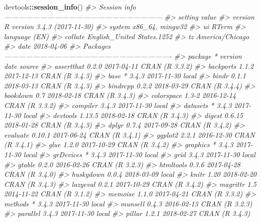 \documentclass [11pt, proquest] {uwthesis}[2015/03/03]
\newenvironment{Shaded}{}{}
\newcommand{\KeywordTok}[1]{\textcolor[rgb]{0.00,0.44,0.13}{\textbf{{#1}}}}
\newcommand{\CommentTok}[1]{\textcolor[rgb]{0.38,0.63,0.69}{\textit{{#1}}}}
\newcommand{\NormalTok}[1]{{#1}}
\newcommand{\OperatorTok}[1]{\textcolor[rgb]{0.00,0.44,0.13}{\textbf{{#1}}}}
\begin{document}
\begin{Shaded}
\begin{Highlighting}[]
\NormalTok{devtools}\OperatorTok{::}\KeywordTok{session_info}\NormalTok{()}
\CommentTok{#> Session info ------------------------------------------------------------------}
\CommentTok{#>  setting  value                       }
\CommentTok{#>  version  R version 3.4.3 (2017-11-30)}
\CommentTok{#>  system   x86_64, mingw32             }
\CommentTok{#>  ui       RTerm                       }
\CommentTok{#>  language (EN)                        }
\CommentTok{#>  collate  English_United States.1252  }
\CommentTok{#>  tz       America/Chicago             }
\CommentTok{#>  date     2018-04-06}
\CommentTok{#> Packages ----------------------------------------------------------------------}
\CommentTok{#>  package    * version date       source        }
\CommentTok{#>  assertthat   0.2.0   2017-04-11 CRAN (R 3.3.2)}
\CommentTok{#>  backports    1.1.2   2017-12-13 CRAN (R 3.4.3)}
\CommentTok{#>  base       * 3.4.3   2017-11-30 local         }
\CommentTok{#>  bindr        0.1.1   2018-03-13 CRAN (R 3.4.3)}
\CommentTok{#>  bindrcpp     0.2.2   2018-03-29 CRAN (R 3.4.4)}
\CommentTok{#>  bookdown     0.7     2018-02-18 CRAN (R 3.4.3)}
\CommentTok{#>  colorspace   1.3-2   2016-12-14 CRAN (R 3.3.2)}
\CommentTok{#>  compiler     3.4.3   2017-11-30 local         }
\CommentTok{#>  datasets   * 3.4.3   2017-11-30 local         }
\CommentTok{#>  devtools     1.13.5  2018-02-18 CRAN (R 3.4.3)}
\CommentTok{#>  digest       0.6.15  2018-01-28 CRAN (R 3.4.3)}
\CommentTok{#>  dplyr        0.7.4   2017-09-28 CRAN (R 3.4.2)}
\CommentTok{#>  evaluate     0.10.1  2017-06-24 CRAN (R 3.4.1)}
\CommentTok{#>  ggplot2      2.2.1   2016-12-30 CRAN (R 3.4.1)}
\CommentTok{#>  glue         1.2.0   2017-10-29 CRAN (R 3.4.2)}
\CommentTok{#>  graphics   * 3.4.3   2017-11-30 local         }
\CommentTok{#>  grDevices  * 3.4.3   2017-11-30 local         }
\CommentTok{#>  grid         3.4.3   2017-11-30 local         }
\CommentTok{#>  gtable       0.2.0   2016-02-26 CRAN (R 3.2.3)}
\CommentTok{#>  htmltools    0.3.6   2017-04-28 CRAN (R 3.4.0)}
\CommentTok{#>  huskydown    0.0.4   2018-03-09 local         }
\CommentTok{#>  knitr        1.20    2018-02-20 CRAN (R 3.4.3)}
\CommentTok{#>  lazyeval     0.2.1   2017-10-29 CRAN (R 3.4.2)}
\CommentTok{#>  magrittr     1.5     2014-11-22 CRAN (R 3.1.2)}
\CommentTok{#>  memoise      1.1.0   2017-04-21 CRAN (R 3.3.2)}
\CommentTok{#>  methods    * 3.4.3   2017-11-30 local         }
\CommentTok{#>  munsell      0.4.3   2016-02-13 CRAN (R 3.2.3)}
\CommentTok{#>  parallel     3.4.3   2017-11-30 local         }
\CommentTok{#>  pillar       1.2.1   2018-02-27 CRAN (R 3.4.3)}

\end{Highlighting}
\end{Shaded}
\end{document}
